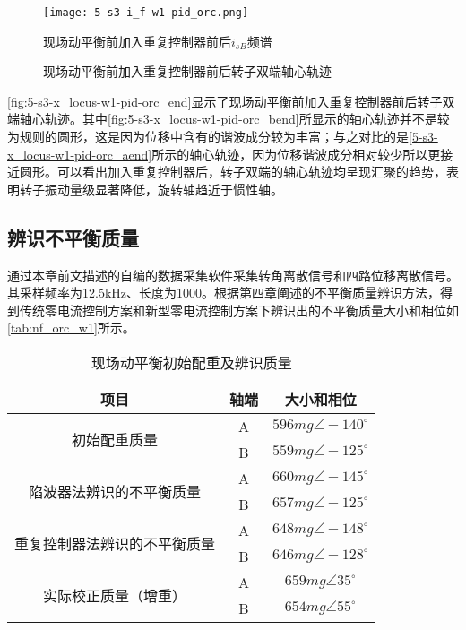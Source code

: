 \begin{figure}
	\texttt{[image: 5-s3-i\_f-w1-pid\_orc.png]}
	\caption{现场动平衡前加入重复控制器前后$i_{sB}$频谱}
	\label{fig:5-s3-i_f-w1-pid_orc}
\end{figure}

\begin{figure}[htb]  
	\quad  
	\caption{现场动平衡前加入重复控制器前后转子双端轴心轨迹}  \label{fig:5-s3-x_locus-w1-pid-orc_end}
\end{figure}

\autoref{fig:5-s3-x_locus-w1-pid-orc_end}显示了现场动平衡前加入重复控制器前后转子双端轴心轨迹。其中\autoref{fig:5-s3-x_locus-w1-pid-orc_bend}所显示的轴心轨迹并不是较为规则的圆形，这是因为位移中含有的谐波成分较为丰富；与之对比的是\autoref{5-s3-x_locus-w1-pid-orc_aend}所示的轴心轨迹，因为位移谐波成分相对较少所以更接近圆形。可以看出加入重复控制器后，转子双端的轴心轨迹均呈现汇聚的趋势，表明转子振动量级显著降低，旋转轴趋近于惯性轴。


\subsection{辨识不平衡质量}

通过本章前文描述的自编的数据采集软件采集转角离散信号和四路位移离散信号。其采样频率为12.5kHz、长度为1000。根据第四章阐述的不平衡质量辨识方法，得到传统零电流控制方案和新型零电流控制方案下辨识出的不平衡质量大小和相位如\autoref{tab:nf_orc_w1}所示。

\begin{table}[htb]
  \caption[现场动平衡初始配重及辨识质量]{现场动平衡初始配重及辨识质量\label{tab:nf_orc_w1}}
\begin{tabular}{ccc}
    \toprule
    	项目  & 轴端 & 大小和相位 \\
    \midrule
		\multirow{2}{*}{初始配重质量}   
		& A  & $596mg \angle -140^{\circ}$      \\
		& B  & $559mg \angle -125^{\circ}$      \\    
		\multirow{2}{*}{陷波器法辨识的不平衡质量}   
		& A  & $660mg \angle -145^{\circ}$      \\
		& B  & $657mg \angle -125^{\circ}$      \\
		\multirow{2}{*}{重复控制器法辨识的不平衡质量} 
		& A  & $648mg \angle -148^{\circ}$      \\
        & B  & $646mg \angle -128^{\circ}$     	\\
		\multirow{2}{*}{实际校正质量（增重）} 
		& A  & $659mg \angle 35^{\circ}$      \\
        & B  & $654mg \angle 55^{\circ}$     	\\        
    \bottomrule
\end{tabular}
\end{table}

